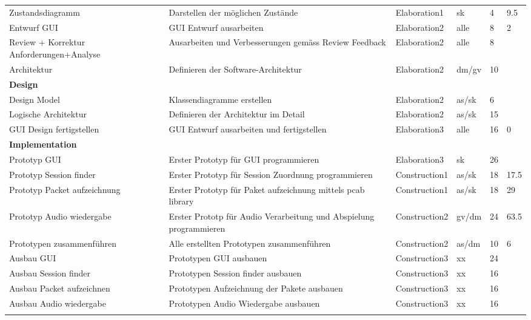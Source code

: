 \documentclass[a4,12pt]{scrartcl}
\begin{document}
\begin{landscape}
\begin{longtable}{ p{5.5cm} p{8cm} l l p{1cm} p{1cm} }
Zustandsdiagramm & Darstellen der möglichen Zustände & Elaboration1  & sk  & 4  & 9.5 \\ \addlinespace
Entwurf GUI & GUI Entwurf ausarbeiten & Elaboration2  & alle  & 8 &2 \\ \addlinespace
Review + Korrektur Anforderungen+Analyse & Ausarbeiten und Verbesserungen gemäss Review Feedback & Elaboration2  & alle  & 8 & \\ \addlinespace
Architektur & Definieren der Software-Architektur & Elaboration2  & dm/gv & 10  & \\ \addlinespace
\textbf{Design} &  &  &  &  & \\ \addlinespace
Design Model & Klassendiagramme erstellen & Elaboration2  & as/sk  &6  & \\ \addlinespace
Logische Architektur& Definieren der Architektur im Detail  & Elaboration2  & as/sk  & 15  & \\ \addlinespace
GUI Design fertigstellen & GUI Entwurf ausarbeiten und fertigstellen  & Elaboration3 & alle &16  &0 \\ \addlinespace
\textbf{Implementation} &  &  &  &  & \\ \addlinespace
Prototyp GUI& Erster Prototyp für GUI programmieren & Elaboration3  & sk  &26  & \\ \addlinespace 
Prototyp Session finder & Erster Prototyp für Session Zuordnung programmieren  & Construction1  & as/sk & 18  & 17.5\\ \addlinespace   
Prototyp Packet aufzeichnung & Erster Prototyp für Paket aufzeichnung mittels pcab library & Construction1  & as/sk  & 18  & 29\\ \addlinespace
Prototyp Audio wiedergabe & Erster Prototp für Audio Verarbeitung und Abspielung programmieren & Construction2  & gv/dm  & 24  & 63.5\\ \addlinespace
Prototypen zusammenführen & Alle erstellten Prototypen zusammenführen & Construction2  & as/dm  & 10  & 6\\ \addlinespace
Ausbau GUI & Prototypen GUI ausbauen & Construction3  & xx  & 24  & \\ \addlinespace
Ausbau Session finder & Prototypen Session finder ausbauen & Construction3  & xx  &16  & \\ \addlinespace
Ausbau Packet aufzeichnen & Prototypen Aufzeichnung der Pakete ausbauen  & Construction3  & xx  & 16  & \\ \addlinespace
Ausbau Audio wiedergabe & Prototypen Audio Wiedergabe ausbauen  & Construction3  & xx & 16 & \\ \addlinespace

\end{longtable}
\end{landscape}
\end{document}
